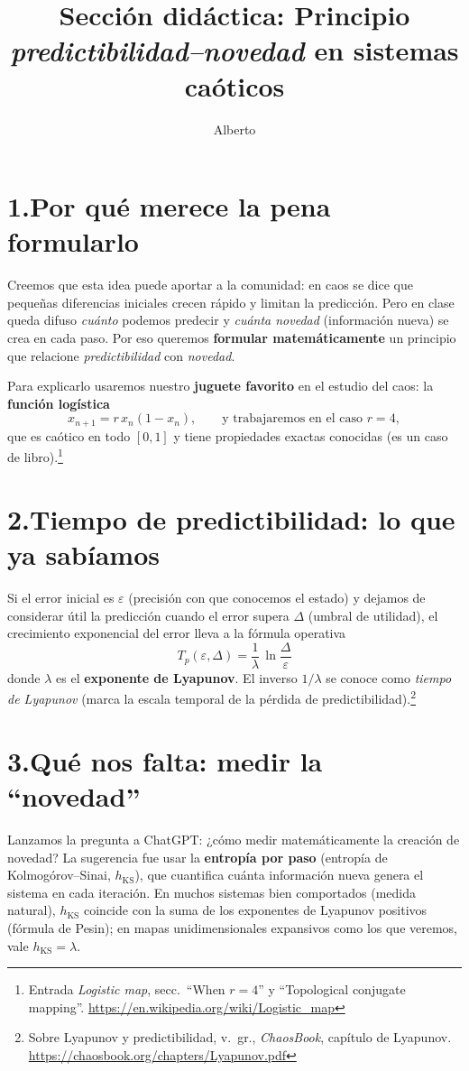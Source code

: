 \documentclass[11pt,a4paper]{article}
\title{Sección didáctica: Principio \emph{predictibilidad--novedad} en sistemas caóticos}
\author{Alberto}
\date{}
\begin{document}
\maketitle

\section*{1.\;Por qué merece la pena formularlo}
Creemos que esta idea puede aportar a la comunidad: en caos se dice que pequeñas diferencias iniciales crecen rápido y limitan la predicción. Pero en clase queda difuso \emph{cuánto} podemos predecir y \emph{cuánta novedad} (información nueva) se crea en cada paso. Por eso queremos \textbf{formular matemáticamente} un principio que relacione \emph{predictibilidad} con \emph{novedad}.

Para explicarlo usaremos nuestro \textbf{juguete favorito} en el estudio del caos: la \textbf{función logística}
\[
x_{n+1}=r\,x_n(1-x_n),\qquad \text{y trabajaremos en el caso } r=4,
\]
que es caótico en todo \([0,1]\) y tiene propiedades exactas conocidas (es un caso de libro).\footnote{Entrada \emph{Logistic map}, secc.\ ``When $r=4$'' y ``Topological conjugate mapping''. \url{https://en.wikipedia.org/wiki/Logistic_map}}

\section*{2.\;Tiempo de predictibilidad: lo que ya sabíamos}
Si el error inicial es $\varepsilon$ (precisión con que conocemos el estado) y dejamos de considerar útil la predicción cuando el error supera $\Delta$ (umbral de utilidad), el crecimiento exponencial del error lleva a la fórmula operativa
\[
\boxed{\,T_p(\varepsilon,\Delta)=\frac{1}{\lambda}\,\ln\!\frac{\Delta}{\varepsilon}\,}
\]
donde $\lambda$ es el \textbf{exponente de Lyapunov}. El inverso $1/\lambda$ se conoce como \emph{tiempo de Lyapunov} (marca la escala temporal de la pérdida de predictibilidad).\footnote{Sobre Lyapunov y predictibilidad, v.\ gr., \emph{ChaosBook}, capítulo de Lyapunov. \url{https://chaosbook.org/chapters/Lyapunov.pdf}}

\section*{3.\;Qué nos falta: medir la ``novedad''}
Lanzamos la pregunta a ChatGPT: ¿cómo medir matemáticamente la creación de novedad? La sugerencia fue usar la \textbf{entropía por paso} (entropía de Kolmogórov--Sinai, $h_{\mathrm{KS}}$), que cuantifica cuánta información nueva genera el sistema en cada iteración. En muchos sistemas bien comportados (medida natural), $h_{\mathrm{KS}}$ coincide con la suma de los exponentes de Lyapunov positivos (fórmula de Pesin); en mapas unidimensionales expansivos como los que veremos, vale $h_{\mathrm{KS}}=\lambda$.
\end{document}
